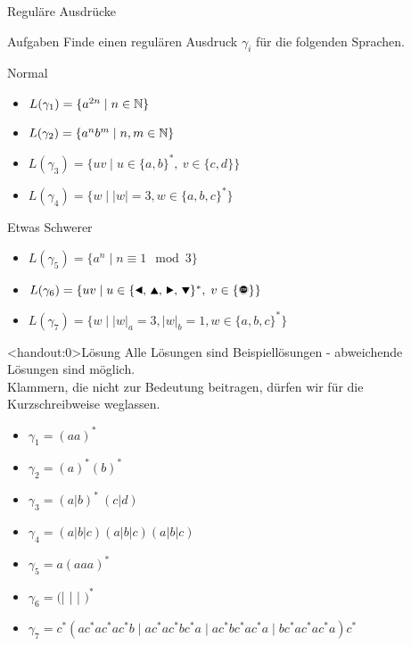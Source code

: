 {
\begin{frame}{Reguläre Ausdrücke}
    \begin{alertblock}{Aufgaben}
        Finde einen regulären Ausdruck $\gamma_i$ für die folgenden Sprachen.
    \end{alertblock}
    \begin{block}{Normal}
        \begin{itemize}
            \item $L(\gamma_1) = \{a^{2n} \mid n\in\mathbb{N}\}$
            \item $L(\gamma_2) = \{a^nb^m \mid n, m\in\mathbb{N}\}$
            \item $L(\gamma_3) = \{uv \mid u\in\{a,b\}^\ast,\ v\in\{c,d\}\}$
            \item $L(\gamma_4) = \{w \mid |w| = 3, w\in \{a,b,c\}^*\}$
        \end{itemize}
    \end{block}
    \begin{block}{Etwas Schwerer}
        \begin{itemize}
            \item $L(\gamma_5) = \{a^n \mid n \equiv 1 \mod 3\}$
            \item $L(\gamma_6) = \{uv\mid u\in\{\text{\Rewind, \MoveUp, \Forward, \MoveDown}\}^\ast,\;v\in\{\text{\Stopsign}\}\}$
            \item $L(\gamma_7) = \{w \mid |w|_a = 3, |w|_b = 1, w\in \{a,b,c\}^*\}$
        \end{itemize}
    \end{block}
\end{frame}
}

{
\begin{frame}<handout:0>{Lösung}
    Alle Lösungen sind Beispiellösungen - abweichende Lösungen sind möglich.\\
    Klammern, die nicht zur Bedeutung beitragen, dürfen wir für die Kurzschreibweise weglassen.
    \begin{itemize}[<+- | alert@+>]
        \item $\gamma_1 = (aa)^*$
        \item $\gamma_2 = (a)^*(b)^*$
        \item $\gamma_3 = (a|b)^*\ (c|d)$
        \item $\gamma_4 = (a|b|c)(a|b|c)(a|b|c)$
        \item $\gamma_5 = a(aaa)^*$
        \item $\gamma_6 = ($\Rewind | \MoveUp | \Forward | \MoveDown$)^*$\Stopsign
        \item $\gamma_7 = c^*(ac^*ac^*ac^*b\mid ac^*ac^*bc^*a\mid ac^*bc^*ac^*a\mid bc^*ac^*ac^*a)c^*$
    \end{itemize}
\end{frame}
}

